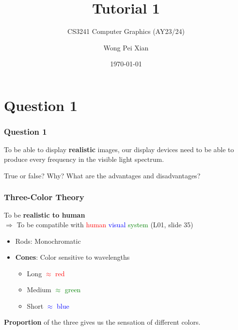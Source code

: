\documentclass{beamer}
\title{Tutorial 1}
\subtitle{CS3241 Computer Graphics (AY23/24)}
\date{\today}
\author{Wong Pei Xian}
\institute[]{\email{e0389023@u.nus.edu}}
\begin{document}
\frame[plain]{\titlepage}

\section{Question 1}

\begin{frame}
    \frametitle{Question 1}
    To be able to display \textbf{realistic} images, our display devices need to be able to produce 
    every frequency in the visible light spectrum.
    
    \vspace*{1em}
    
    True or false? Why? What are the advantages and disadvantages?
\end{frame}

\begin{frame}
    \frametitle{Three-Color Theory}

    To be \textbf{realistic to human} \\
    $\Rightarrow$ To be compatible with 
    \textcolor{red}{human} \textcolor{blue}{visual} \textcolor{green}{system}
    (L01, slide 35)

    \begin{itemize}
        \item Rods: Monochromatic
        \item \textbf{Cones}: Color sensitive to wavelengths
        \begin{itemize}
            \item Long \textcolor{red}{$\approx$ red}
            \item Medium \textcolor{green}{$\approx$ green}
            \item Short \textcolor{blue}{$\approx$ blue}
        \end{itemize}
    \end{itemize}

    \textbf{Proportion} of the three gives us the sensation of different colors.
\end{frame}
\end{document}
